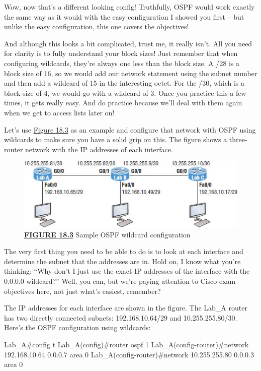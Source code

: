 Wow, now that's a different looking config! Truthfully, OSPF would work
exactly the same way as it would with the easy configuration I showed
you first -- but unlike the easy configuration, this one covers the
objectives!

And although this looks a bit complicated, trust me, it really isn't.
All you need for clarity is to fully understand your block sizes! Just
remember that when configuring wildcards, they're always one less than
the block size. A /28 is a block size of 16, so we would add our network
statement using the subnet number and then add a wildcard of 15 in the
interesting octet. For the /30, which is a block size of 4, we would go
with a wildcard of 3. Once you practice this a few times, it gets really
easy. And do practice because we'll deal with them again when we get to
access lists later on!

Let's use \protect\hyperlink{c18.xhtmlux5cux23figure18-3}{Figure 18.3}
as an example and configure that network with OSPF using wildcards to
make sure you have a solid grip on this. The figure shows a three-router
network with the IP addresses of each interface.

\begin{figure}
   \centering
   \includegraphics[width=.8\textwidth]{images/c18f003.jpg}
   \caption{{\protect\hyperlink{c18.xhtmlux5cux23figureanchor18-3}{\textbf{FIGURE 18.3}} Sample OSPF wildcard configuration}}
\end{figure}

The very first thing you need to be able to do is to look at each
interface and determine the subnet that the addresses are in. Hold on, I
know what you're thinking: ``Why don't I just use the exact IP addresses
of the interface with the 0.0.0.0 wildcard?'' Well, you can, but we're
paying attention to Cisco exam objectives here, not just what's easiest,
remember?

The IP addresses for each interface are shown in the figure. The Lab\_A router has two
directly connected subnets: 192.168.10.64/29 and 10.255.255.80/30.
Here's the OSPF configuration using wildcards:

\begin{cli}
Lab_A#config t
Lab_A(config)#router ospf 1
Lab_A(config-router)#network 192.168.10.64 0.0.0.7 area 0
Lab_A(config-router)#network 10.255.255.80 0.0.0.3 area 0
\end{cli}

